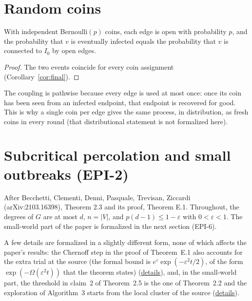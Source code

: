 \section{Random coins}
\begin{theorem}\label{thm:perc}
\leanok{}
With independent Bernoulli$(p)$ coins, each edge is open with probability $p$, and the
probability that $v$ is eventually infected equals the probability that $v$ is connected to $I_0$
by open edges.
\end{theorem}
\begin{proof}\leanok
The two events coincide for every coin assignment (Corollary~\ref{cor:final}).
\end{proof}
The coupling is pathwise because every edge is used at most once: once its coin has been seen
from an infected endpoint, that endpoint is recovered for good. This is why a single coin per edge
gives the same process, in distribution, as fresh coins in every round (that distributional
statement is not formalized here).

\section{Subcritical percolation and small outbreaks (EPI-2)}\label{sec:bcdptz-small-world}
After Becchetti, Clementi, Denni, Pasquale, Trevisan, Ziccardi (arXiv:2103.16398), Theorem 2.3
and its proof, Theorem E.1. Throughout, the degrees of $G$ are at most $d$, $n = |V|$, and
$p(d-1) \le 1 - \varepsilon$ with $0 < \varepsilon < 1$. The small-world part of the paper is
formalized in the next section (EPI-6).

A few details are formalized in a slightly different form, none of which affects the paper's
results: the Chernoff step in the proof of Theorem~E.1 also accounts for the extra trial at the
source (the formal bound is $e^{\varepsilon}\exp(-\varepsilon^2 t/2)$, of the form
$\exp(-\Omega(\varepsilon^2 t))$ that the theorem states)
(\href{https://github.com/formal-dynamics/leanamics/blob/main/epidemics/FORMALIZATION_DIFFERENCES.md#subcritical-percolation-and-small-outbreaks-subcritical-epi-2}{details}),
and, in the small-world part, the threshold in claim~2 of Theorem~2.5 is the one of
Theorem~2.2 and the exploration of Algorithm~3 starts from the local cluster of the source
(\href{https://github.com/formal-dynamics/leanamics/blob/main/epidemics/FORMALIZATION_DIFFERENCES.md#small-world-networks-below-the-percolation-threshold-smallworld-epi-6}{details}).

